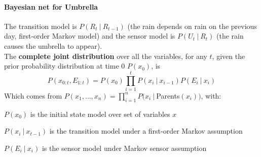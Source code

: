 \documentclass[10pt]{report}
\begin{document}
\paragraph{Bayesian net for Umbrella}
\begin{center}
\end{center}
The transition model is $P(R_t\:|\:R_{t-1})$ (the rain depends on rain on the previous day, first-order Markov model) and the sensor model is $P(U_t\:|\:R_t)$ (the rain causes the umbrella to appear).\\
The \textbf{complete joint distribution} over all the variables, for any $t$, given the prior probability distribution at time 0 $P(x_0)$, is
$$P(x_{0:t},E_{1:t})=P(x_0)\prod_{i=1}^t P(x_i\:|\:x_{i-1})P(E_i\:|\:x_i)$$
Which comes from $P(x_1,\ldots,x_n)=\prod_{i=1}^n P(x_i\:|\:$Parents$(x_i))$, with:
\begin{list}{}{}
	\item $P(x_0)$ is the initial state model over set of variables $x$
	\item $P(x_i\:|\:x_{t-1})$ is the transition model under a first-order Markov assumption
	\item $P(E_i\:|\:x_i)$ is the sensor model under Markov sensor assumption
\end{list}
\end{document}
